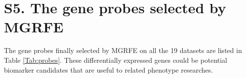 \documentclass[10pt,journal,compsoc]{IEEEtran}
\begin{document}
	\section*{S5. The gene probes selected by MGRFE}

	The gene probes finally selected by MGRFE on all the 19 datasets are listed in Table \ref{Tab:probes}. These differentially expressed genes could be potential biomarker candidates that are useful to related phenotype researches.
	

	
	
\end{document}
